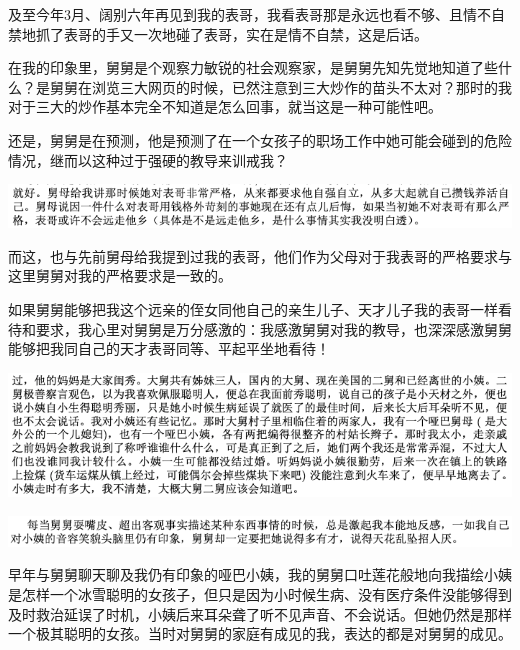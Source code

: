 \documentclass[9pt, b5paper]{article}
\begin{document}
及至今年3月、阔别六年再见到我的表哥，我看表哥那是永远也看不够、且情不自禁地抓了表哥的手又一次地碰了表哥，实在是情不自禁，这是后话。 

在我的印象里，舅舅是个观察力敏锐的社会观察家，是舅舅先知先觉地知道了些什么？是舅舅在浏览三大网页的时候，已然注意到三大炒作的苗头不太对？那时的我对于三大的炒作基本完全不知道是怎么回事，就当这是一种可能性吧。

还是，舅舅是在预测，他是预测了在一个女孩子的职场工作中她可能会碰到的危险情况，继而以这种过于强硬的教导来训戒我？

\begin{center}
\includegraphics[width=.9\linewidth]{./pic/backups_plans_20210412_112222.png}
\end{center}

而这，也与先前舅母给我提到过我的表哥，他们作为父母对于我表哥的严格要求与这里舅舅对我的严格要求是一致的。

如果舅舅能够把我这个远亲的侄女同他自己的亲生儿子、天才儿子我的表哥一样看待和要求，我心里对舅舅是万分感激的：我感激舅舅对我的教导，也深深感激舅舅能够把我同自己的天才表哥同等、平起平坐地看待！

\begin{center}
\includegraphics[width=.9\linewidth]{./pic/backups_plans_20210414_101343.png}
\end{center}

\begin{center}
\includegraphics[width=.9\linewidth]{./pic/backups_plans_20210412_114832.png}
\end{center}

早年与舅舅聊天聊及我仍有印象的哑巴小姨，我的舅舅口吐莲花般地向我描绘小姨是怎样一个冰雪聪明的女孩子，但只是因为小时候生病、没有医疗条件没能够得到及时救治延误了时机，小姨后来耳朵聋了听不见声音、不会说话。但她仍然是那样一个极其聪明的女孩。当时对舅舅的家庭有成见的我，表达的都是对舅舅的成见。
\end{document}
